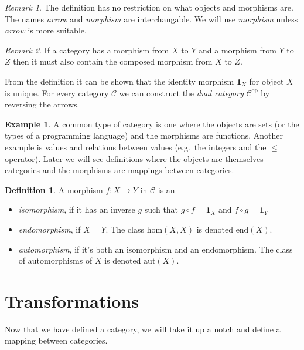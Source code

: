 \documentclass[11pt,a4paper]{scrartcl}
\newcommand{\idm}[1]{\mathbf{1}_{#1}}
\newcommand{\cdef}[1]{\emph{#1}}
\theoremstyle{plain}
\theoremstyle{definition}
\newtheorem{defn}{Definition}
\newtheorem{exmp}{Example}
\theoremstyle{remark}
\newtheorem*{remark}{Remark}
\begin{document}
\begin{remark}
	The definition has no restriction on what objects and morphisms are. The names \emph{arrow} and \emph{morphism} are interchangable. We will use \emph{morphism} unless \emph{arrow} is more suitable.
\end{remark}
\begin{remark}
	If a category has a morphism from $X$ to $Y$ and a morphism from $Y$ to $Z$ then it must also contain the composed morphism from $X$ to $Z$.
\end{remark}

From the definition it can be shown that the identity morphism $\idm{X}$ for object $X$ is unique. For every category $\mathcal C$ we can construct the \cdef{dual category} $\mathcal{C}^\text{op}$ by reversing the arrows.

\begin{exmp}
	A common type of category is one where the objects are sets (or the types of a programming language) and the morphisms are functions. Another example is values and relations between values (e.g.\ the integers and the $\leq$ operator). Later we will see definitions where the objects are themselves categories and the morphisms are mappings between categories.
\end{exmp}

\begin{defn}
A morphism $f\colon X \to Y$ in $\mathcal C$ is an
\begin{itemize}
	\item \cdef{isomorphism}, if it has an inverse $g$ such that $g\circ f = \idm{X}$ and $f\circ g = \idm{Y}$
	\item \cdef{endomorphism}, if $X = Y$. The class $\text{hom}(X, X)$ is denoted $\text{end}(X)$.
	\item \cdef{automorphism}, if it's both an isomorphism and an endomorphism. The class of automorphisms of $X$ is denoted $\text{aut}(X)$.
\end{itemize}
\end{defn}

\section{Transformations}

Now that we have defined a category, we will take it up a notch and define a mapping between categories.
\end{document}

